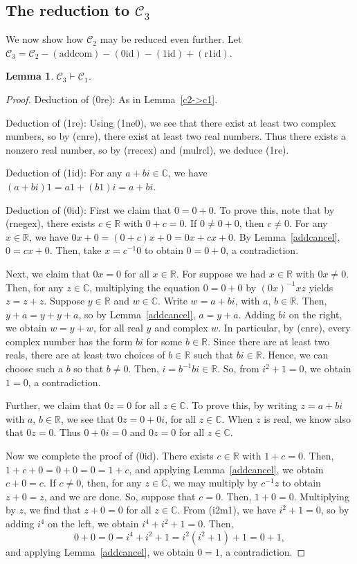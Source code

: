 \documentclass{article}
\newcommand\bC{\mathbb{C}}
\newcommand\bR{\mathbb{R}}
\newcommand\cC{\mathcal{C}}
\newtheorem{lemma}{Lemma}[section]
\begin{document}
\subsection{The reduction to $\cC_3$}

We now show how $\cC_2$ may be reduced even further.
Let $\cC_3 = \cC_2 - \mathrm{(addcom)} - \mathrm{(0id)} - \mathrm{(1id)} + \mathrm{(r1id)}$. 

\begin{lemma}
$\cC_3 \vdash \cC_1$.
\end{lemma}
\begin{proof}
Deduction of (0re): As in Lemma~\ref{c2->c1}.

Deduction of (1re): Using (1ne0), we see that there exist at least two complex numbers, so by (cnre), there exist at least two real numbers. Thus there exists a nonzero real number, so by (rrecex) and (mulrcl), we deduce (1re).

Deduction of (1id): For any $a + bi \in \bC$, we have $(a + bi)1 = a1 + (b1)i = a + bi$.

Deduction of (0id): First we claim that $0 = 0 + 0$. To prove this, note that by (rnegex), there exists $c \in \bR$ with $0 + c = 0$. If $0 \ne 0 + 0$, then $c \ne 0$. For any $x \in \bR$, we have $0x + 0 = (0 + c)x + 0 = 0x + cx + 0$. By Lemma~\ref{addcancel}, $0 = cx + 0$.  Then, take $x = c^{-1}0$ to obtain $0 = 0 + 0$, a contradiction.

Next, we claim that $0x = 0$ for all $x \in \bR$. For suppose we had $x \in \bR$ with $0x \ne 0$. Then, for any $z \in \bC$, multiplying the equation $0 = 0 + 0$ by $(0x)^{-1}xz$ yields $z = z + z$. Suppose $y \in \bR$ and $w \in \bC$. Write $w = a + bi$, with $a$, $b \in \bR$. Then, $y + a = y + y + a$, so by Lemma~\ref{addcancel}, $a = y + a$. Adding $bi$ on the right, we obtain $w = y + w$, for all real $y$ and complex $w$. In particular, by (cnre), every complex number has the form $bi$ for some $b \in \bR$. Since there are at least two reals, there are at least two choices of $b \in \bR$ such that $bi \in \bR$. Hence, we can choose such a $b$ so that $b \ne 0$. Then, $i = b^{-1}bi \in \bR$. So, from $i^2 + 1 = 0$, we obtain $1 = 0$, a contradiction.

Further, we claim that $0z = 0$ for all $z \in \bC$. To prove this, by writing $z = a + bi$ with $a$, $b \in \bR$, we see that $0z = 0 + 0i$, for all $z \in \bC$. When $z$ is real, we know also that $0z = 0$. Thus $0 + 0i = 0$ and $0z = 0$ for all $z \in \bC$.

Now we complete the proof of (0id). There exists $c \in \bR$ with $1 + c = 0$. Then, $1 + c + 0 = 0 + 0 = 0 = 1 + c$, and applying Lemma~\ref{addcancel}, we obtain $c + 0 = c$. If $c \ne 0$, then, for any $z \in \bC$, we may multiply by $c^{-1}z$ to obtain $z + 0 = z$, and we are done. So, suppose that $c = 0$. Then, $1 + 0 = 0$. Multiplying by $z$, we find that $z + 0 = 0$ for all $z \in \bC$. From (i2m1), we have $i^2 + 1 = 0$, so by adding $i^4$ on the left, we obtain $i^4 + i^2 + 1 = 0$. Then,
\[0 + 0 = 0 = i^4 + i^2 + 1 = i^2(i^2 + 1) + 1 = 0 + 1,\]
and applying Lemma~\ref{addcancel}, we obtain $0 = 1$, a contradiction.


\end{proof}
\end{document}

